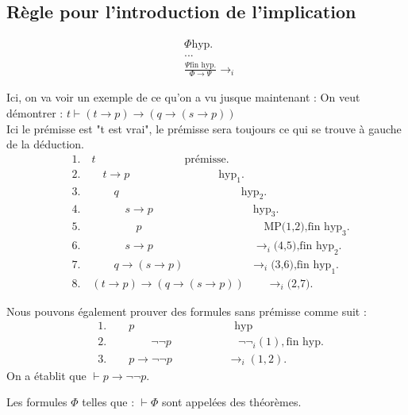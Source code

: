 \subsection{Règle pour l'introduction de l'implication}
\begin{align*}
&\Phi\text{hyp.} \\
&...\\
&\frac{\Psi\text{fin hyp.}}{\Phi\rightarrow\Psi}\rightarrow_i
\end{align*}
\begin{example}
    Ici, on va voir un exemple de ce qu'on a vu jusque maintenant :\newline
    On veut démontrer : $t \vdash (t\rightarrow p)\rightarrow(q\rightarrow(s\rightarrow p))$ \\
    Ici le prémisse est "t est vrai", le prémisse sera toujours ce qui se trouve à gauche de la déduction.\\
    \begin{align*}
        &1. \quad t \quad\quad\quad\quad\quad\quad\quad\quad \text{prémisse}.\\
        &2. \quad\quad t\rightarrow p \quad\quad\quad\quad\quad\quad\quad\quad \text{hyp}_1.\\
        &3. \quad\quad\quad q \quad\quad\quad\quad\quad\quad\quad\quad\quad\quad\quad \text{hyp}_2.\\
        &4. \quad\quad\quad\quad s\rightarrow p \quad\quad\quad\quad\quad\quad\quad\quad\quad \text{hyp}_3.\\
        &5. \quad\quad\quad\quad\quad p \quad\quad\quad\quad\quad\quad\quad\quad\quad\quad\quad \text{MP(1,2),fin hyp}_3.\\
        &6. \quad\quad\quad\quad s\rightarrow p \quad\quad\quad\quad\quad\quad\quad\quad\quad \rightarrow_i\text{(4,5),fin hyp}_2.\\
        &7. \quad\quad\quad q\rightarrow(s\rightarrow p) \quad\quad\quad\quad\quad\quad \rightarrow_i\text{(3,6),fin hyp}_1.\\
        &8. \quad (t\rightarrow p)\rightarrow(q\rightarrow(s\rightarrow p)) \quad\quad \rightarrow_i\text{(2,7)}.
    \end{align*}

    Nous pouvons également prouver des formules sans prémisse comme suit :
    \begin{align*}
        &1. \quad\quad p \quad\quad\quad\quad\quad\quad\quad\quad\quad \text{hyp}\\
        &2. \quad\quad\quad\quad \neg\neg p \quad\quad\quad\quad\quad\quad \neg\neg_i(1),\text{fin hyp.}\\
        &3. \quad\quad p\rightarrow\neg\neg p \quad\quad\quad\quad\quad \rightarrow_i(1,2).
    \end{align*}
    On a établit que $\vdash p \rightarrow\neg\neg p$.
    \begin{remark}
        Les formules $\Phi$ telles que : $\vdash\Phi$ sont appelées des théorèmes.
    \end{remark}
\end{example}



